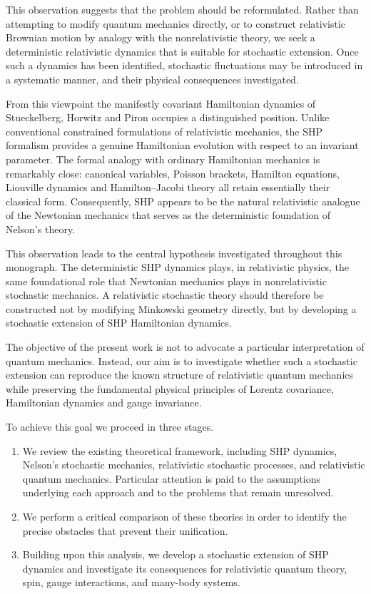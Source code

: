 This observation suggests that the problem should be reformulated.
Rather than attempting to modify quantum mechanics directly, or to
construct relativistic Brownian motion by analogy with the
nonrelativistic theory, we seek a deterministic relativistic dynamics
that is suitable for stochastic extension. Once such a dynamics has been
identified, stochastic fluctuations may be introduced in a systematic
manner, and their physical consequences investigated.

From this viewpoint the manifestly covariant Hamiltonian dynamics of
Stueckelberg, Horwitz and Piron occupies a distinguished position.
Unlike conventional constrained formulations of relativistic mechanics,
the SHP formalism provides a genuine Hamiltonian evolution with respect
to an invariant parameter. The formal analogy with ordinary Hamiltonian
mechanics is remarkably close: canonical variables, Poisson brackets,
Hamilton equations, Liouville dynamics and Hamilton--Jacobi theory all
retain essentially their classical form. Consequently, SHP appears to be
the natural relativistic analogue of the Newtonian mechanics that serves
as the deterministic foundation of Nelson's theory.

This observation leads to the central hypothesis investigated throughout
this monograph.
The deterministic SHP dynamics plays, in relativistic physics, the same
foundational role that Newtonian mechanics plays in nonrelativistic
stochastic mechanics. A relativistic stochastic theory should therefore
be constructed not by modifying Minkowski geometry directly, but by
developing a stochastic extension of SHP Hamiltonian dynamics.

The objective of the present work is not to advocate a particular
interpretation of quantum mechanics. Instead, our aim is to investigate
whether such a stochastic extension can reproduce the known structure of
relativistic quantum mechanics while preserving the fundamental physical
principles of Lorentz covariance, Hamiltonian dynamics and gauge
invariance.

To achieve this goal we proceed in three stages.
\begin{enumerate}
   \item
    We review the existing theoretical framework, including SHP
    dynamics, Nelson's stochastic mechanics, relativistic stochastic
    processes, and relativistic quantum mechanics. Particular attention is
    paid to the assumptions underlying each approach and to the problems
    that remain unresolved.
   \item
    We perform a critical comparison of these theories in order to
    identify the precise obstacles that prevent their unification.
   \item
    Building upon this analysis, we develop a stochastic extension
    of SHP dynamics and investigate its consequences for relativistic
    quantum theory, spin, gauge interactions, and many-body systems.
\end{enumerate}
